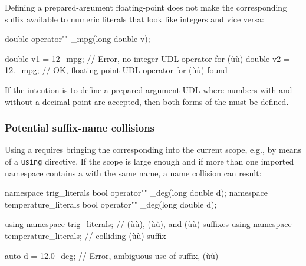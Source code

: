 Defining a prepared-argument floating-point  does
not make the corresponding suffix available to numeric literals that
look like integers and vice versa:

\begin{emcppslisting}
double operator"" _mpg(long double v);

double v1 = 12_mpg;   // Error, no integer UDL operator for (ù{}ù)
double v2 = 12._mpg;  // OK, floating-point UDL operator for (ù{}ù) found
\end{emcppslisting}

\noindent If the intention is to define a prepared-argument UDL where numbers with and without a decimal point are accepted, then both forms of the  must be defined.

\subsubsection[Potential suffix-name collisions]{Potential suffix-name collisions}\label{potential-suffix-name-collisions}

Using a  requires bringing the corresponding
 into the current scope, e.g., by means of a
\lstinline!using! directive. If the scope is large enough and if more than
one imported namespace contains a  with the same
name, a name collision can result:

\begin{emcppshiddenlisting}[emcppsbatch=e25]
namespace trig_literals {
bool operator"" _deg(long double d);
}
namespace temperature_literals {
bool operator"" _deg(long double d);
}
\end{emcppshiddenlisting}
\begin{emcppslisting}[emcppsbatch=e25]
using namespace trig_literals;        // (ù{}ù), (ù{}ù), and (ù{}ù) suffixes
using namespace temperature_literals; // colliding (ù{}ù) suffix

auto d = 12.0_deg;  // Error, ambiguous use of suffix, (ù{}ù)
\end{emcppslisting}



